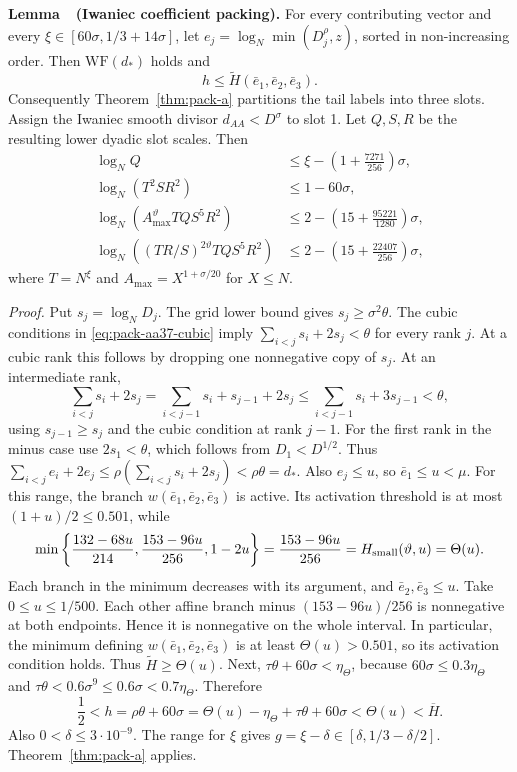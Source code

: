 \setcounter{lemma}{\value{theorem}}
\textbf{Lemma~\thelemma\ (Iwaniec coefficient packing).}\label{lem:aa37-pack}
For every contributing vector and
every $\xi\in[60\sigma,1/3+14\sigma]$, let
$e_j=\log_N\min(D_j^\rho,z)$, sorted in non-increasing order.
Then $\mathrm{WF}(d_*)$ holds and
\[
 h\le\widetilde H(\bar e_1,\bar e_2,\bar e_3).
 \tag{4.8}\label{eq:pack-aa37-hyp}
\]
Consequently Theorem~\ref{thm:pack-a} partitions the tail labels into three slots.
Assign the Iwaniec smooth divisor $d_{AA}<D^\sigma$ to slot 1.
Let $Q,S,R$ be the resulting lower dyadic slot scales. Then
\[
\begin{aligned}
 \log_N Q&\le \xi-\left(1+\frac{7271}{256}\right)\sigma,\\
 \log_N(T^2SR^2)&\le1-60\sigma,\\
 \log_N(A_{\max}^{\vartheta}TQS^5R^2)
   &\le2-\left(15+\frac{95221}{1280}\right)\sigma,\\
 \log_N\left((TR/S)^{2\vartheta}TQS^5R^2\right)
   &\le2-\left(15+\frac{22407}{256}\right)\sigma,
\end{aligned}
\tag{4.9}\label{eq:pack-scales}
\]
where $T=N^\xi$ and $A_{\max}=X^{1+\sigma/20}$ for $X\le N$.

\emph{Proof.} Put $s_j=\log_ND_j$. The grid lower bound gives
$s_j\ge\sigma^2\theta$. The cubic conditions in
\eqref{eq:pack-aa37-cubic} imply $\sum_{i<j}s_i+2s_j<\theta$
for every rank $j$. At a cubic rank this follows by dropping one
nonnegative copy of $s_j$. At an intermediate rank,
\[
 \sum_{i<j}s_i+2s_j
 =\sum_{i<j-1}s_i+s_{j-1}+2s_j
 \le\sum_{i<j-1}s_i+3s_{j-1}<\theta,
\]
using $s_{j-1}\ge s_j$ and the cubic condition at rank $j-1$.
For the first rank in the minus case use $2s_1<\theta$, which follows
from $D_1<D^{1/2}$. Thus $\sum_{i<j}e_i+2e_j\le
\rho(\sum_{i<j}s_i+2s_j)<\rho \theta=d_*$.
Also $e_j\le u$, so $\bar e_1\le u<\mu$.
For this range, the branch $w(\bar e_1,\bar e_2,\bar e_3)$ is active.
Its activation threshold is at most $(1+u)/2\le0.501$, while
\[
 \min\left\{\frac{132-68u}{214},
              \frac{153-96u}{256},1-2u\right\}
 =\frac{153-96u}{256}
 =H_{\rm small}(\vartheta,u)=\Theta(u).
\]
Each branch in the minimum decreases with its argument, and
$\bar e_2,\bar e_3\le u$. Take $0\le u\le1/500$. Each other affine branch minus
$(153-96u)/256$ is nonnegative at both endpoints. Hence it is
nonnegative on the whole interval. In particular, the
minimum defining $w(\bar e_1,\bar e_2,\bar e_3)$ is at least
$\Theta(u)>0.501$, so its activation condition holds. Thus
$\widetilde H\ge\Theta(u)$. Next,
$\tau \theta+60\sigma<\eta_\Theta$, because
$60\sigma\le0.3\eta_\Theta$ and
$\tau \theta<0.6\sigma^9\le0.6\sigma<0.7\eta_\Theta$.
Therefore
\[
 \frac12<h=\rho \theta+60\sigma
 =\Theta(u)-\eta_\Theta+\tau \theta+60\sigma
 <\Theta(u)<\overline H.
\]
Also $0<\delta\le3\cdot10^{-9}$. The range for $\xi$ gives
$g=\xi-\delta\in[\delta,1/3-\delta/2]$.
Theorem~\ref{thm:pack-a} applies.

